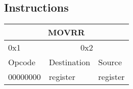 \documentclass{article}
\begin{document}
\subsection{Instructions}
\begin{table}[h!]
\centering
\begin{tabular} { | p{2cm} | | p{2cm} | p{2cm} |}
  \hline
  \multicolumn{3}{|c|}{MOVRR}\\
  \hline
  0x1 & \multicolumn{2}{|c|}{0x2}\\
  \hline
  Opcode & Destination & Source\\
  00000000 & register & register\\
  \hline
\end{tabular}
\end{table}
\end{document}

